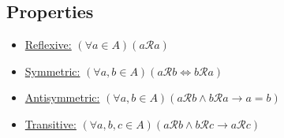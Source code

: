 \documentclass{article}
\begin{document}
\subsection*{Properties}
    
    \begin{itemize}
        \item \underline{Reflexive:} $(\forall a \in A)(a\mathcal{R}a)$
        \item \underline{Symmetric:} $(\forall a, b \in A)(a\mathcal{R}b \iff b\mathcal{R}a)$
        \item \underline{Antisymmetric:} $(\forall a, b\in A)(a\mathcal{R}b \wedge b\mathcal{R}a \rightarrow a=b)$
        \item \underline{Transitive:} $(\forall a, b, c\in A)(a\mathcal{R}b \wedge b\mathcal{R}c \rightarrow a\mathcal{R}c)$
    \end{itemize}
\end{document}
